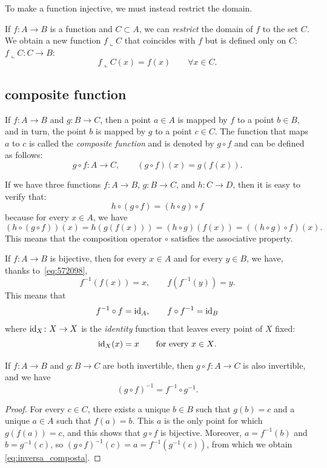To make a function injective, we must instead restrict the domain.

\begin{definition}[restriction]
  \label{def:restrizione}%
    If $f\colon A\to B$ is a function and $C\subset A$, we can \emph{restrict}
  the domain of $f$ to the set $C$.  We obtain a
  new function $f\llcorner C$ that coincides with $f$ but is defined only on
  $C$: $f\llcorner C\colon C\to B$:
  \[
  f\llcorner C(x) = f(x)\qquad 
  \forall x \in C.
  \]
\end{definition}

\subsection{composite function}
%

If $f\colon A\to B$ and $g\colon B\to C$, then a point $a\in A$ is mapped by $f$
to a point $b\in B$, and in turn, the point $b$ is mapped by $g$ to a point $c
\in C$. The function that maps $a$ to $c$ is called the \emph{composite
function}   and is
denoted by $g\circ f$ and can be defined as follows:
\[
g\circ f \colon A \to C, \qquad 
(g\circ f)(x) = g(f(x)).  
\]

If we have three functions $f\colon A\to B$, $g\colon B\to C$, and $h\colon C\to
D$, then it is easy to verify that:
\[
   h \circ (g\circ f) = (h\circ g) \circ f
\]
because for every $x\in A$, we have
\[
(h \circ (g\circ f)) (x) =
h(g(f(x))) = (h\circ g)(f(x)) = ((h\circ g) \circ f) (x).  
\]
This means that the composition operator $\circ$ satisfies the associative
property.

If $f\colon A\to B$ is bijective, then for every $x\in A$ and for every $y\in
B$, we have, thanks to~\eqref{eq:572098},
\[
  f^{-1} (f(x)) = x,
  \qquad f(f^{-1}(y)) = y.
\]
This means that 
\[
  f^{-1}\circ f = \mathrm{id}_A, 
  \qquad
  f\circ f^{-1} = \mathrm{id}_B
\] 
where $\mathrm{id}_X\colon X\to X$ is the \emph{identity} function 
  that leaves every point of $X$ fixed:
 \index{$\id$}
\[
\mathrm{id}_X(x) = x \qquad \text{for every $x\in X$}.
\]

\begin{theorem}
If $f\colon A\to B$ and $g\colon B\to C$ are both invertible, then $g\circ
f\colon A\to C$ is also invertible, and we have
\begin{equation}\label{eq:inversa_composta}
  (g\circ f)^{-1} = f^{-1}\circ g^{-1}.
\end{equation}
\end{theorem}
\begin{proof}    
For every $c\in C$, there exists a unique $b\in B$ such that $g(b)=c$ and a
unique $a\in A$ such that $f(a)=b$. This $a$ is the only point for which
$g(f(a))=c$, and this shows that $g\circ f$ is bijective. Moreover,
$a=f^{-1}(b)$ and $b=g^{-1}(c)$, so $(g\circ f)^{-1}(c) = a =
f^{-1}(g^{-1}(c))$, from which we obtain \eqref{eq:inversa_composta}.
\end{proof}

